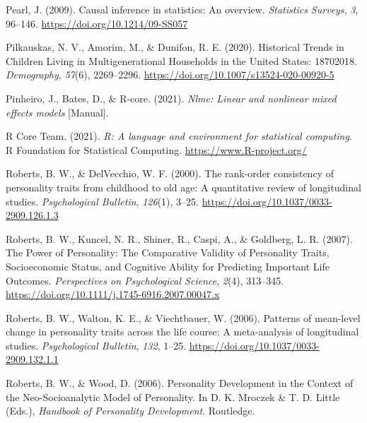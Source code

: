 \documentclass[
  english,
  man, noextraspace]{apa7}
\begin{document}
\leavevmode\hypertarget{ref-pearlCausalInferenceStatistics2009}{}%
Pearl, J. (2009). Causal inference in statistics: An overview. \emph{Statistics Surveys}, \emph{3}, 96--146. \url{https://doi.org/10.1214/09-SS057}

\leavevmode\hypertarget{ref-pilkauskasHistoricalTrendsChildren2020}{}%
Pilkauskas, N. V., Amorim, M., \& Dunifon, R. E. (2020). Historical Trends in Children Living in Multigenerational Households in the United States: 18702018. \emph{Demography}, \emph{57}(6), 2269--2296. \url{https://doi.org/10.1007/s13524-020-00920-5}

\leavevmode\hypertarget{ref-R-nlme}{}%
Pinheiro, J., Bates, D., \& R-core. (2021). \emph{Nlme: Linear and nonlinear mixed effects models} {[}Manual{]}.

\leavevmode\hypertarget{ref-R-base}{}%
R Core Team. (2021). \emph{R: A language and environment for statistical computing}. R Foundation for Statistical Computing. \url{https://www.R-project.org/}

\leavevmode\hypertarget{ref-robertsRankorderConsistencyPersonality2000}{}%
Roberts, B. W., \& DelVecchio, W. F. (2000). The rank-order consistency of personality traits from childhood to old age: A quantitative review of longitudinal studies. \emph{Psychological Bulletin}, \emph{126}(1), 3--25. \url{https://doi.org/10.1037/0033-2909.126.1.3}

\leavevmode\hypertarget{ref-robertsPowerPersonalityComparative2007}{}%
Roberts, B. W., Kuncel, N. R., Shiner, R., Caspi, A., \& Goldberg, L. R. (2007). The Power of Personality: The Comparative Validity of Personality Traits, Socioeconomic Status, and Cognitive Ability for Predicting Important Life Outcomes. \emph{Perspectives on Psychological Science}, \emph{2}(4), 313--345. \url{https://doi.org/10.1111/j.1745-6916.2007.00047.x}

\leavevmode\hypertarget{ref-robertsPatternsMeanlevelChange2006a}{}%
Roberts, B. W., Walton, K. E., \& Viechtbauer, W. (2006). Patterns of mean-level change in personality traits across the life course: A meta-analysis of longitudinal studies. \emph{Psychological Bulletin}, \emph{132}, 1--25. \url{https://doi.org/10.1037/0033-2909.132.1.1}

\leavevmode\hypertarget{ref-robertsPersonalityDevelopmentContext2006}{}%
Roberts, B. W., \& Wood, D. (2006). Personality Development in the Context of the Neo-Socioanalytic Model of Personality. In D. K. Mroczek \& T. D. Little (Eds.), \emph{Handbook of Personality Development}. Routledge.
\end{document}
